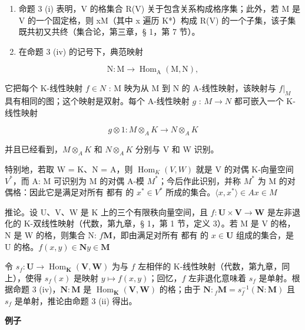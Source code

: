 \begin{enumerate}
\def\labelenumi{(\arabic{enumi})}
\setcounter{enumi}{1}
\item
  命题 3 (i) 表明，V 的格集合 R(V) 关于包含关系构成格序集；此外，若 M 是 V 的一个固定格，则 xM（其中 x 遍历 K*）构成 R(V) 的一个子集，该子集既共初又共终（集合论，第三章，§ 1，第 7 节）。
\item
  在命题 3 (iv) 的记号下，典范映射
\end{enumerate}

\[
\mathrm{N}: \mathrm{M} \rightarrow \operatorname{Hom} _ {\mathrm{A}} (\mathrm{M}, \mathrm{N}),
\]

它把每个 K-线性映射 \(f \in N\) : M 映为从 M 到 N 的 A-线性映射，该映射与 \(f|_{M}\) 具有相同的图；这个映射是双射。每个 A-线性映射 \(g\) : \(M \to N\) 都可嵌入一个 K-线性映射

\[
g \otimes 1: M \otimes_ {A} K \rightarrow N \otimes_ {A} K
\]

并且已经看到，\(M \otimes_{A} K\) 和 \(N \otimes_{A} K\) 分别与 V 和 W 识别。

特别地，若取 W = K、N = A，则 \(\operatorname{Hom}_{K}(V, W)\) 就是 V 的对偶 K-向量空间 \(V^{*}\)，而 A: M 可识别为 M 的对偶 A-模 \(M^{*}\)；今后作此识别，并称 \(M^{*}\) 为 M 的对偶格：因此它是满足对所有  都有  的 \(x^{*} \in V^{*}\) 所成的集合。\(\langle x, x^{*} \rangle \in A\)\(x \in M\)

推论。设 U、V、W 是 K 上的三个有限秩向量空间，且 \(f: \mathbf{U} \times \mathbf{V} \to \mathbf{W}\) 是左非退化的 K-双线性映射（代数，第九章，§ 1，第 1 节，定义 3）。若 M 是 V 的格，N 是 W 的格，则集合 N: \(f\mathbf{M}\)，即由满足对所有  都有  的 \(x \in \mathbf{U}\) 组成的集合，是 U 的格。\(f(x, y) \in \mathbf{N}\)\(y \in \mathbf{M}\)

令 \(s_f \colon \mathbf{U} \to \operatorname{Hom}_{\mathbf{K}}(\mathbf{V}, \mathbf{W})\) 为与 \(f\) 左相伴的 K-线性映射（代数，第九章，同上），使得 \(s_f(x)\) 是映射 \(y \mapsto f(x, y)\)；回忆，\(f\) 左非退化意味着 \(s_f\) 是单射。根据命题 3 (iv)，\(\mathbf{N} \colon \mathbf{M}\) 是 \(\operatorname{Hom}_{\mathbf{K}}(\mathbf{V}, \mathbf{W})\) 的格；由于 \(\mathbf{N} \colon {}_f \mathbf{M} = s_f^{-1}(\mathbf{N} \colon \mathbf{M})\) 且 \(s_f\) 是单射，推论由命题 3 (ii) 得出。

\textbf{例子}\par

